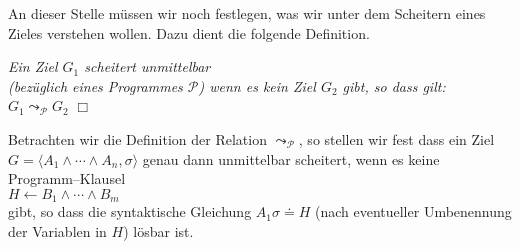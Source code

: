 An dieser Stelle m\"{u}ssen wir noch festlegen, was wir unter dem Scheitern eines Zieles
verstehen wollen.  Dazu dient die folgende Definition.

\begin{Definition}
{\em
    Ein Ziel $G_1$ \emph{scheitert unmittelbar} \\
    (bez\"{u}glich eines Programmes $\mathcal{P}$) wenn es kein Ziel
    $G_2$ gibt, so dass gilt: \\[0.1cm]
    \hspace*{1.3cm} $G_1 \leadsto_\mathcal{P} G_2$ 
}  \hspace*{\fill} $\Box$
\end{Definition}
Betrachten wir die Definition der Relation $\leadsto_\mathcal{P}$, so stellen wir fest
dass ein Ziel $G = \langle A_1 \wedge \cdots \wedge A_n, \sigma \rangle$ genau dann
unmittelbar scheitert, wenn es keine Programm--Klausel \\[0.1cm]
\hspace*{1.3cm} $H \leftarrow B_1 \wedge \cdots \wedge B_m$ \\[0.1cm]
gibt, so dass die syntaktische Gleichung $A_1\sigma \doteq H$ (nach eventueller
Umbenennung der Variablen in $H$) l\"{o}sbar ist.

